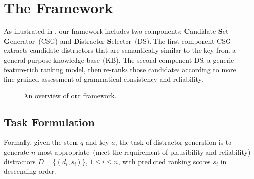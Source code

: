 \section{The Framework}
\label{sec:method}
As illustrated in , our framework includes two 
components: \textbf{C}andidate \textbf{S}et \textbf{G}enerator~(CSG) and \textbf{D}istractor \textbf{S}elector~(DS). The first component CSG extracts candidate distractors that are semantically similar to the key from a general-purpose knowledge base~(KB). The second component DS, a generic feature-rich ranking model, then re-ranks those candidates according to more fine-grained assessment of grammatical consistency and reliability.
\begin{figure}[th]
\centering
{}
\caption{An overview of our framework.} \label{fig:framework}
\end{figure}

\subsection{Task Formulation}
Formally, given the stem $q$ and key $a$, the task of distractor generation is to generate $n$ most 
appropriate~(meet the requirement of plausibility and reliability) distractors $D = \{(d_i, s_i)\}$, $1\leq i\leq n$,
with predicted ranking scores $s_i$ in descending order.

